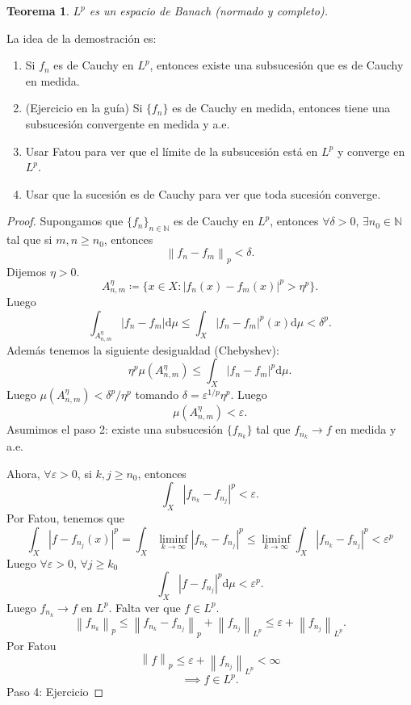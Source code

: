 \documentclass{article}
\newtheorem{theorem}{Teorema}[subsection]
\theoremstyle{definition}
\theoremstyle{remark}
\numberwithin{equation}{section}
\newcommand{\N}{\mathbb{N}}
\renewcommand{\d}{\mathrm{d}}
\newcommand{\e}{\varepsilon}
\newcommand{\oo}{\infty}
\newcommand{\abs}[1]{\left| #1 \right|}
\newcommand{\norm}[1]{\left\lVert #1 \right\rVert}
\newcommand{\fecha}[1]{\begin{flushright} \underline{#1} \end{flushright}}
\begin{document}
\begin{theorem}
  $L^p$ es un espacio de Banach (normado y completo).
\end{theorem}
La idea de la demostración es:
\begin{enumerate}[(1)]
  \item Si $f_n$ es de Cauchy en $L^p$, entonces existe una subsucesión que es de Cauchy en medida.
  \item (Ejercicio en la guía) Si $\{f_n\}$ es de Cauchy en medida, entonces tiene una subsucesión convergente en medida y a.e.
  \item Usar Fatou para ver que el límite de la subsucesión está en $L^p$ y converge en $L^p$.
  \item Usar que la sucesión es de Cauchy para ver que toda sucesión converge.
\end{enumerate}
\begin{proof}
  Supongamos que $\{f_n\}_{n\in\N}$ es de Cauchy en $L^p$, entonces $\forall \delta > 0$, $\exists n_0 \in \N$ tal que si $m,n \geq n_0$, entonces 
  \[ \norm{f_n - f_m}_p < \delta. \]
  Dijemos $\eta > 0$. 
  \[ A_{n,m}^\eta \coloneqq \{x \in X \colon \abs{f_n(x) - f_m(x)}^p > \eta^p\}. \]
  Luego 
  \[ \int_{A_{n,m}^\eta} \abs{f_n - f_m} \d\mu \leq \int_X \abs{f_n - f_m}^p(x) \d\mu < \delta^p. \]
  Además tenemos la siguiente desigualdad (Chebyshev): 
  \[ \eta^p \mu(A_{n,m}^\eta) \leq \int_X \abs{f_n - f_m}^p \d\mu. \]
  Luego $\mu(A_{n,m}^\eta) < \delta^p/\eta^p$ tomando $\delta = \e^{1/p} \eta^p$.
  Luego 
  \[ \mu(A_{n,m}^\eta) < \e. \]
  Asumimos el paso 2: %
  existe una subsucesión $\{f_{n_k}\}$ tal que $f_{n_k} \to f$ en medida y a.e.

  Ahora, $\forall \e>0$, si $k,j \geq n_0$, entonces 
  \[ \int_X \abs{f_{n_k} - f_{n_j}}^p < \e. \]
  Por Fatou, tenemos que 
  \[ \int_X \abs{f - f_{n_j}(x)}^p = \int_X \liminf_{k \to \oo} \abs{f_{n_k} - f_{n_j}}^p \leq \liminf_{k\to\oo} \int_X \abs{f_{n_k} - f_{n_j}}^p < \e^p \]
  Luego $\forall \e>0$, $\forall j \geq k_0$ 
  \[ \int_X \abs{f - f_{n_j}}^p \d\mu < \e^p. \]
  Luego $f_{n_k} \to f$ en $L^p$. Falta ver que $f \in L^p$. 
  \[ \norm{f_{n_k}}_p \leq \norm{f_{n_k} - f_{n_j}}_p + \norm{f_{n_j}}_{L^p} \leq \e + \norm{f_{n_j}}_{L^p}. \]
  Por Fatou 
  \[ \norm{f}_p \leq \e + \norm{f_{n_j}}_{L^p} < \oo \] 
  \[ \implies f \in L^p. \]
  Paso 4: Ejercicio %
\end{proof}

\end{document}
